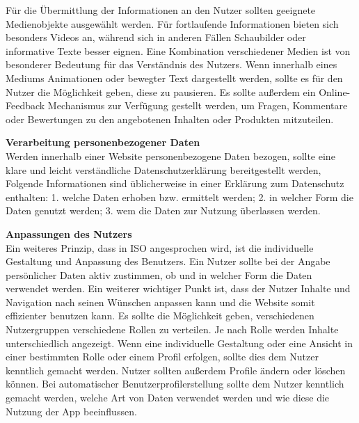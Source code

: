 \documentclass[utf8,biblatex]{lni}
\begin{document}
Für die Übermittlung der Informationen an den Nutzer sollten geeignete Medienobjekte ausgewählt werden. Für fortlaufende Informationen bieten sich besonders Videos an, während sich in anderen Fällen Schaubilder oder informative Texte besser eignen. Eine Kombination verschiedener Medien ist von besonderer Bedeutung für das Verständnis des Nutzers. Wenn innerhalb eines Mediums Animationen oder bewegter Text dargestellt werden, sollte es für den Nutzer die Möglichkeit geben, diese zu pausieren. Es sollte außerdem ein Online-Feedback Mechanismus zur Verfügung gestellt werden, um Fragen, Kommentare oder Bewertungen zu den angebotenen Inhalten oder Produkten mitzuteilen. 

\textbf{Verarbeitung personenbezogener Daten}\\
Werden innerhalb einer Website personenbezogene Daten bezogen, sollte eine klare und leicht verständliche
Datenschutzerklärung bereitgestellt werden, 
Folgende Informationen sind üblicherweise in einer Erklärung zum Datenschutz enthalten: 1. welche Daten erhoben bzw. ermittelt werden;
2. in welcher Form die Daten genutzt werden;
3. wem die Daten zur Nutzung überlassen werden.

\textbf{Anpassungen des Nutzers}\\
Ein weiteres Prinzip, dass in ISO angesprochen wird, ist die individuelle Gestaltung und Anpassung des Benutzers. Ein Nutzer sollte bei der Angabe persönlicher Daten aktiv zustimmen, ob und in welcher Form die Daten verwendet werden. Ein weiterer wichtiger Punkt ist, dass der Nutzer Inhalte und Navigation nach seinen Wünschen anpassen kann und die Website somit effizienter benutzen kann. Es sollte die Möglichkeit geben, verschiedenen Nutzergruppen verschiedene Rollen zu verteilen. Je nach Rolle werden Inhalte unterschiedlich angezeigt. Wenn eine individuelle Gestaltung oder eine Ansicht in einer bestimmten Rolle oder einem Profil erfolgen, sollte dies dem Nutzer kenntlich gemacht werden. Nutzer sollten außerdem Profile ändern oder löschen können. Bei automatischer Benutzerprofilerstellung sollte dem Nutzer kenntlich gemacht werden, welche Art von Daten verwendet werden und wie diese die Nutzung der App beeinflussen.
\end{document}
